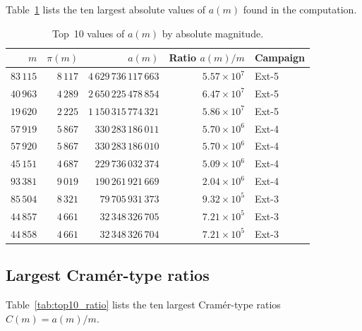 \documentclass[11pt]{article}
\theoremstyle{definition}
\theoremstyle{remark}
\numberwithin{equation}{section}
\begin{document}
Table~\ref{tab:top10_absolute} lists the ten largest absolute
values of $a(m)$ found in the computation.

\begin{table}[ht]
\centering
\caption{Top~10 values of $a(m)$ by absolute magnitude.}
\label{tab:top10_absolute}
\small
\begin{tabular}{rrrrl}
\toprule
$m$ & $\pi(m)$ & $a(m)$ & Ratio $a(m)/m$ & Campaign \\
\midrule
$83\,115$ & $8\,117$ & $4\,629\,736\,117\,663$ & $5.57 \times 10^7$ & Ext-5 \\
$40\,963$ & $4\,289$ & $2\,650\,225\,478\,854$ & $6.47 \times 10^7$ & Ext-5 \\
$19\,620$ & $2\,225$ & $1\,150\,315\,774\,321$ & $5.86 \times 10^7$ & Ext-5 \\
$57\,919$ & $5\,867$ & $330\,283\,186\,011$ & $5.70 \times 10^6$ & Ext-4 \\
$57\,920$ & $5\,867$ & $330\,283\,186\,010$ & $5.70 \times 10^6$ & Ext-4 \\
$45\,151$ & $4\,687$ & $229\,736\,032\,374$ & $5.09 \times 10^6$ & Ext-4 \\
$93\,381$ & $9\,019$ & $190\,261\,921\,669$ & $2.04 \times 10^6$ & Ext-4 \\
$85\,504$ & $8\,321$ & $79\,705\,931\,373$ & $9.32 \times 10^5$ & Ext-3 \\
$44\,857$ & $4\,661$ & $32\,348\,326\,705$ & $7.21 \times 10^5$ & Ext-3 \\
$44\,858$ & $4\,661$ & $32\,348\,326\,704$ & $7.21 \times 10^5$ & Ext-3 \\
\bottomrule
\end{tabular}
\end{table}

\subsection{Largest Cram\'er-type ratios}

Table~\ref{tab:top10_ratio} lists the ten largest
Cram\'er-type ratios $C(m) = a(m)/m$.
\end{document}
